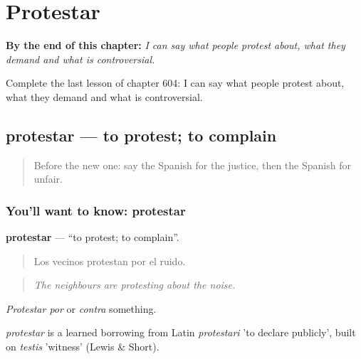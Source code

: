 
\chapter{Protestar}
\label{ch:es-protestar}

\begin{chapteropening}
\textbf{By the end of this chapter:} \emph{I can say what people protest about, what they demand and what is controversial.}

Complete the last lesson of chapter 604: I can say what people protest about, what they demand and what is controversial.
\end{chapteropening}

\section[protestar]{protestar — to protest; to complain}

\label{lesson:ES-C604-protestar}



\begin{quote}
Before the new one: say the Spanish for the justice, then the Spanish for unfair.
\end{quote}

\subsection*{You'll want to know: protestar}
\textbf{protestar} — \textquotedblleft{}to protest; to complain\textquotedblright{}.

\begin{quote}
Los vecinos protestan por el ruido.
\end{quote}

\begin{quote}
\emph{The neighbours are protesting about the noise.}
\end{quote}

\emph{Protestar por} or \emph{contra} something.

\begin{cousinweb}
\emph{protestar} is a learned borrowing from Latin \emph{protestari} 'to declare publicly', built on \emph{testis} 'witness' (Lewis \& Short).
\end{cousinweb}

